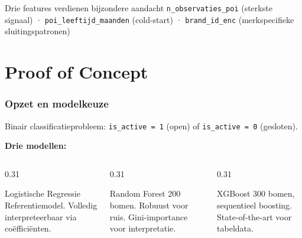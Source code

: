 \documentclass[aspectratio=169]{beamer}
\begin{document}
\begin{frame}
        \vspace{0.4em}
        \begin{block}{Drie features verdienen bijzondere aandacht}
            \texttt{n\_observaties\_poi} (sterkste signaal) · \texttt{poi\_leeftijd\_maanden} (cold-start) · \texttt{brand\_id\_enc} (merkspecifieke sluitingspatronen)
        \end{block}
        
    \end{frame}
    
    \section{Proof of Concept}
    
    \begin{frame}
        \frametitle{Opzet en modelkeuze}
        
        Binair classificatieprobleem: \texttt{is\_active = 1} (open) of \texttt{is\_active = 0} (gesloten).
        
        \vspace{0.8em}
        \textbf{Drie modellen:}
        \begin{columns}
            \begin{column}{0.31\textwidth}
                \begin{block}{Logistische Regressie}
                    Referentiemodel. Volledig interpreteerbaar via coëfficiënten.
                \end{block}
            \end{column}
            \begin{column}{0.31\textwidth}
                \begin{block}{Random Forest}
                    200 bomen. Robuust voor ruis. Gini-importance voor interpretatie.
                \end{block}
            \end{column}
            \begin{column}{0.31\textwidth}
                \begin{block}{XGBoost}
                    300 bomen, sequentieel boosting. State-of-the-art voor tabeldata.
                \end{block}
            \end{column}
        \end{columns}
        
    \end{frame}
    
\end{document}
